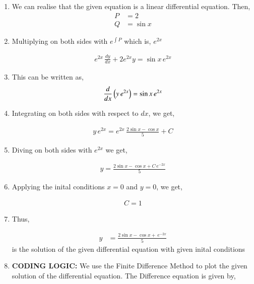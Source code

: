 \documentclass[journal]{IEEEtran}
\begin{document}
\begin{enumerate}
    \item We can realise that the given equation is a linear differential equation. Then,
    \begin{align}
	    P &= 2\\
        Q &= \sin{x}
    \end{align}

    \item Multiplying on both sides with $e^{\int P}$ which is, $e^{2x}$

    \begin{align}
	    e^{2x}\, \frac{dy}{dx} + 2e^{2x} y = \sin{x}\, e^{2x}
    \end{align}
    
    \item This can be written as,
    \begin{align}
	    \frac{d}{dx}\left(y\, e^{2x}\right) = \sin{x}\, e^{2x}
    \end{align}

    \item Integrating on both sides with respect to $dx$, we get,

    \begin{align}
	    y\, e^{2x} = e^{2x}\, \frac{2\sin{x} - \cos{x}}{5} + C
    \end{align}

    \item Diving on both sides with $e^{2x}$ we get,

    \begin{align}
	    y = \frac{2 \sin{x} - \cos{x} + C\, e^{-2x}}{5}
    \end{align}

    
    \item Applying the inital conditions $x = 0$ and $y = 0$, we get,

    \begin{align}
        C = 1
    \end{align}

    \item Thus,

    \begin{align}
        y &= \frac{2 \sin{x} - \cos{x} + \, e^{-2x}}{5}
    \end{align}
    is the solution of the given differential equation with given inital conditions\\
    
    
    \item \textbf{CODING LOGIC:} We use the Finite Difference Method to plot the given solution of the differential equation. The Difference equation is given by,
    

\end{enumerate}
\end{document}
